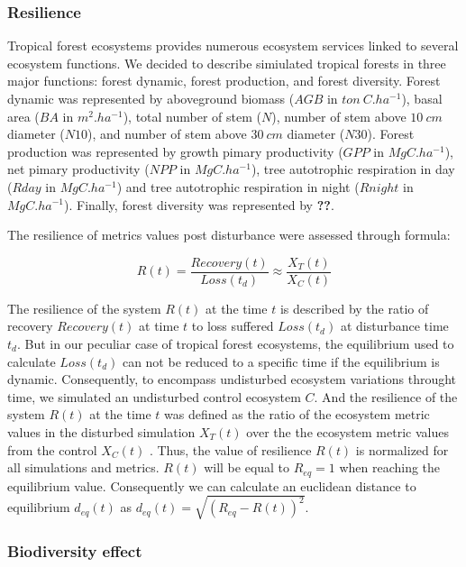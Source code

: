 \documentclass[12pt,]{article}
\theoremstyle{definition}
\theoremstyle{definition}
\theoremstyle{remark}
\begin{document}
\subsubsection{Resilience}\label{resilience}

Tropical forest ecosystems provides numerous ecosystem services linked
to several ecosystem functions. We decided to describe simiulated
tropical forests in three major functions: forest dynamic, forest
production, and forest diversity. Forest dynamic was represented by
aboveground biomass (\(AGB\) in \(ton~C.ha^{-1}\)), basal area (\(BA\)
in \(m^2.ha^{-1}\)), total number of stem (\(N\)), number of stem above
\(10~cm\) diameter (\(N10\)), and number of stem above \(30~cm\)
diameter (\(N30\)). Forest production was represented by growth pimary
productivity (\(GPP\) in \(MgC.ha^{-1}\)), net pimary productivity
(\(NPP\) in \(MgC.ha^{-1}\)), tree autotrophic respiration in day
(\(Rday\) in \(MgC.ha^{-1}\)) and tree autotrophic respiration in night
(\(Rnight\) in \(MgC.ha^{-1}\)). Finally, forest diversity was
represented by \textbf{??}.

The resilience of metrics values post disturbance were assessed through
\citet{Henry2012} formula:

\begin{equation}
  R\left(t\right)=\frac{Recovery\left(t\right)}{Loss\left(t_d\right)} \approx \frac{X_T(t)}{X_C(t)}
  \label{eq:Resilience}
\end{equation}

The resilience of the system \(R(t)\) at the time \(t\) is described by
the ratio of recovery \(Recovery(t)\) at time \(t\) to loss suffered
\(Loss(t_d)\) at disturbance time \(t_d\). But in our peculiar case of
tropical forest ecosystems, the equilibrium used to calculate
\(Loss(t_d)\) can not be reduced to a specific time if the equilibrium
is dynamic. Consequently, to encompass undisturbed ecosystem variations
throught time, we simulated an undisturbed control ecosystem \(C\). And
the resilience of the system \(R(t)\) at the time \(t\) was defined as
the ratio of the ecosystem metric values in the disturbed simulation
\(X_T(t)\) over the the ecosystem metric values from the control
\(X_C(t)\) . Thus, the value of resilience \(R(t)\) is normalized for
all simulations and metrics. \(R(t)\) will be equal to \(R_{eq} = 1\)
when reaching the equilibrium value. Consequently we can calculate an
euclidean distance to equilibrium \(d_{eq}(t)\) as
\(d_{eq}(t) = \sqrt{(R_{eq} - R(t))^2}\).

\subsubsection{Biodiversity effect}\label{biodiversity-effect}
\end{document}
